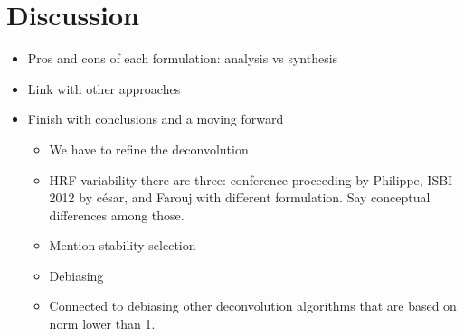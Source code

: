 \section{Discussion}

\begin{itemize}
    \item Pros and cons of each formulation: analysis vs synthesis
    \item Link with other approaches
    \item Finish with conclusions and a moving forward
    \begin{itemize}
        \item We have to refine the deconvolution
        \item HRF variability there are three: conference proceeding by Philippe, ISBI 2012 by césar, and Farouj with different formulation. Say conceptual differences among those.
        \item Mention stability-selection\cite{meinshausen2010stability}
        \item Debiasing
        \item Connected to debiasing other deconvolution algorithms that are based on norm lower than 1.
    \end{itemize}
\end{itemize}